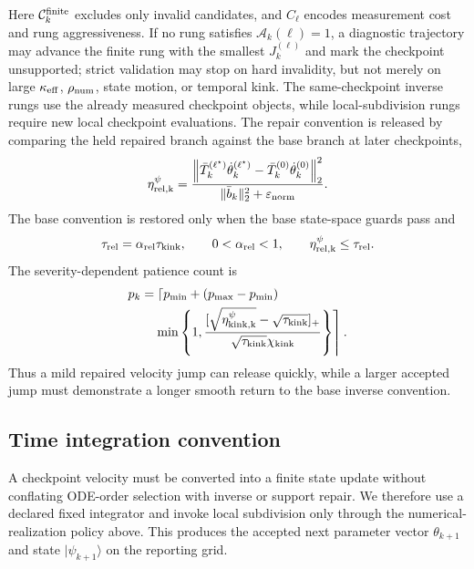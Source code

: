 \documentclass[
  reprint,
  amsmath,
  amssymb,
  aps,
  pra,
  nofootinbib,
  superscriptaddress,
  floatfix
]{revtex4-2}
\newcommand{\eps}{\varepsilon}
\newcommand{\ket}[1]{|#1\rangle}
\begin{document}
Here $\mathcal C_k^{\rm finite}$ excludes only invalid candidates, and $C_\ell$ encodes measurement cost and rung aggressiveness.  If no rung satisfies $\mathcal A_k(\ell)=1$, a diagnostic trajectory may advance the finite rung with the smallest $J_k^{(\ell)}$ and mark the checkpoint unsupported; strict validation may stop on hard invalidity, but not merely on large $\kappa_{\rm eff}$, $\rho_{\rm num}$, state motion, or temporal kink.  The same-checkpoint inverse rungs use the already measured checkpoint objects, while local-subdivision rungs require new local checkpoint evaluations.  The repair convention is released by comparing the held repaired branch against the base branch at later checkpoints,
\begin{equation}
\eta_{\rm rel,k}^{\psi}
=
\frac{
\left\|
\bar T_k^{(\ell^\star)}\dot\theta_k^{(\ell^\star)}
-
\bar T_k^{(0)}\dot\theta_k^{(0)}
\right\|_2^2
}{
\|\bar b_k\|_2^2+\eps_{\rm norm}
}.
\label{eq:return_to_base_kink_release}
\end{equation}
The base convention is restored only when the base state-space guards pass and
\begin{equation}
\tau_{\rm rel}=\alpha_{\rm rel}\tau_{\rm kink},
\qquad
0<\alpha_{\rm rel}<1,
\qquad
\eta_{\rm rel,k}^{\psi}\le\tau_{\rm rel}.
\label{eq:kink_release_threshold}
\end{equation}
The severity-dependent patience count is
\begin{equation}
\begin{aligned}
p_k
&=
\left\lceil
p_{\min}
+
(p_{\max}-p_{\min})
\right.
\\
&\quad\left.
\min\left\{
1,
\frac{
[\sqrt{\eta_{\rm kink,k}^{\psi}}-\sqrt{\tau_{\rm kink}}]_+
}{
\sqrt{\tau_{\rm kink}}\chi_{\rm kink}
}
\right\}
\right\rceil .
\end{aligned}
\label{eq:kink_release_patience}
\end{equation}
Thus a mild repaired velocity jump can release quickly, while a larger accepted jump must demonstrate a longer smooth return to the base inverse convention.

\subsection{Time integration convention}

A checkpoint velocity must be converted into a finite state update without conflating ODE-order selection with inverse or support repair.  We therefore use a declared fixed integrator and invoke local subdivision only through the numerical-realization policy above.  This produces the accepted next parameter vector $\theta_{k+1}$ and state $\ket{\psi_{k+1}}$ on the reporting grid.
\end{document}
